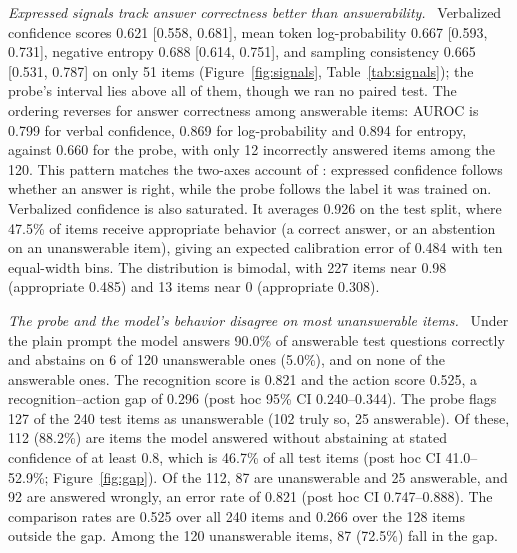 \documentclass[10pt]{article}
\renewcommand{\paragraph}[1]{\par\vspace{0.3em}\noindent\textit{#1}\ }
\begin{document}
\paragraph{Expressed signals track answer correctness better than answerability.}
Verbalized confidence scores 0.621 [0.558, 0.681], mean token log-probability 0.667 [0.593, 0.731], negative entropy 0.688 [0.614, 0.751], and sampling consistency 0.665 [0.531, 0.787] on only 51 items (Figure~\ref{fig:signals}, Table~\ref{tab:signals}); the probe's interval lies above all of them, though we ran no paired test. The ordering reverses for answer correctness among answerable items: AUROC is 0.799 for verbal confidence, 0.869 for log-probability and 0.894 for entropy, against 0.660 for the probe, with only 12 incorrectly answered items among the 120. This pattern matches the two-axes account of \citet{wagner2026twoaxes}: expressed confidence follows whether an answer is right, while the probe follows the label it was trained on. Verbalized confidence is also saturated. It averages 0.926 on the test split, where 47.5\% of items receive appropriate behavior (a correct answer, or an abstention on an unanswerable item), giving an expected calibration error of 0.484 with ten equal-width bins. The distribution is bimodal, with 227 items near 0.98 (appropriate 0.485) and 13 items near 0 (appropriate 0.308).



\paragraph{The probe and the model's behavior disagree on most unanswerable items.}
Under the plain prompt the model answers 90.0\% of answerable test questions correctly and abstains on 6 of 120 unanswerable ones (5.0\%), and on none of the answerable ones. The recognition score is 0.821 and the action score 0.525, a recognition--action gap of 0.296 (post hoc 95\% CI 0.240--0.344). The probe flags 127 of the 240 test items as unanswerable (102 truly so, 25 answerable). Of these, 112 (88.2\%) are items the model answered without abstaining at stated confidence of at least 0.8, which is 46.7\% of all test items (post hoc CI 41.0--52.9\%; Figure~\ref{fig:gap}). Of the 112, 87 are unanswerable and 25 answerable, and 92 are answered wrongly, an error rate of 0.821 (post hoc CI 0.747--0.888). The comparison rates are 0.525 over all 240 items and 0.266 over the 128 items outside the gap. Among the 120 unanswerable items, 87 (72.5\%) fall in the gap.
\end{document}
